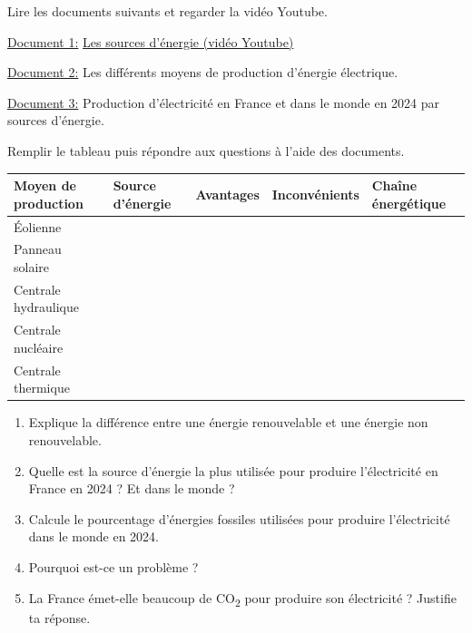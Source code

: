 \documentclass[11pt,a4paper]{article}
\begin{document}


Lire les documents suivants et regarder la vidéo Youtube.

\uline{Document 1:} \href{https://www.youtube.com/watch?v=HoGvRN5oNUM}{Les sources d'énergie (vidéo Youtube)}

\uline{Document 2:} Les différents moyens de production d'énergie électrique.

\uline{Document 3:} Production d'électricité en France et dans le monde en 2024 par sources d'énergie.


Remplir le tableau puis répondre aux questions à l'aide des documents.

\vspace{0.5em}

\renewcommand{\arraystretch}{2}
\begin{center}
\begin{tabular}{|p{4cm}|p{2cm}|p{3cm}|p{3cm}|p{5.5cm}|}
    \hline
    \rowcolor{headergrey}
    \centering\textbf{Moyen de production} &
    \centering\textbf{Source d'énergie} &
    \centering\textbf{Avantages} &
    \centering\textbf{Inconvénients} &
    \centering\arraybackslash\textbf{Chaîne énergétique} \\
    \hline
    \rule{0pt}{2cm} Éolienne & & & & \\
    \hline
    \rule{0pt}{2cm} Panneau solaire & & & & \\
    \hline
    \rule{0pt}{2cm} Centrale hydraulique & & & & \\
    \hline
    \rule{0pt}{2cm} Centrale nucléaire & & & & \\
    \hline
    \rule{0pt}{2cm} Centrale thermique & & & & \\
    \hline
\end{tabular}
\end{center}

\begin{enumerate}
    \item Explique la différence entre une énergie renouvelable et une énergie non renouvelable.

    \item Quelle est la source d'énergie la plus utilisée pour produire l'électricité en France en 2024 ? Et dans le monde ?

    \item Calcule le pourcentage d'énergies fossiles utilisées pour produire l'électricité dans le monde en 2024.

    \item Pourquoi est-ce un problème ?

    \item La France émet-elle beaucoup de CO\textsubscript{2} pour produire son électricité ? Justifie ta réponse.
\end{enumerate}
\end{document}
